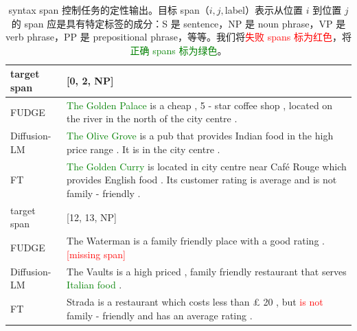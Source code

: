 \documentclass{article}
\newcommand\errorspan[1]{\textcolor{red}{#1}}
\newcommand\greenspan[1]{\textcolor{green}{#1}}
\begin{document}
\begin{table}
{\begin{tabular}{lp{13cm}}
\toprule
target span & [0, 2, NP]\\
\midrule
FUDGE & \greenspan{The Golden Palace} is a cheap , 5 - star coffee shop , located on the river in the north of the city centre . \\
Diffusion-LM & \greenspan{The Olive Grove} is a pub that provides Indian food in the high price range . It is in the city centre . \\
FT &  \greenspan{The Golden Curry} is located in city centre near Café Rouge which provides English food . Its customer rating is average and is not family - friendly . \\
\toprule
target span & [12, 13, NP]\\
\midrule
FUDGE & The Waterman is a family friendly place with a good rating .\errorspan{ [missing span]}\\
Diffusion-LM &   The Vaults is a high priced , family friendly restaurant that serves \greenspan{Italian food} . \\
FT &  Strada is a restaurant which costs less than £ 20 , but \errorspan{is not} family - friendly and has an average rating . \\
 
\bottomrule
\end{tabular}}
\caption{\label{app:qualitative-span} syntax span 控制任务的定性输出。目标 span（$i,j,$label）表示从位置 $i$ 到位置 $j$ 的 span 应是具有特定标签的成分：S 是 sentence，NP 是 noun phrase，VP 是 verb phrase，PP 是 prepositional phrase，等等。我们将\errorspan{失败 spans 标为红色}，将\greenspan{正确 spans 标为绿色}。}
\end{table}
\end{document}
